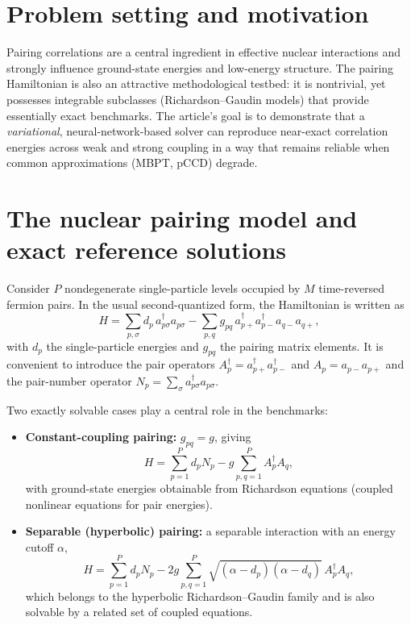 
\section{Problem setting and motivation}

Pairing correlations are a central ingredient in effective nuclear
interactions and strongly influence ground-state energies and
low-energy structure. The pairing Hamiltonian is also an attractive
methodological testbed: it is nontrivial, yet possesses integrable
subclasses (Richardson--Gaudin models) that provide essentially exact
benchmarks. The article's goal is to demonstrate that a
\emph{variational}, neural-network-based solver can reproduce
near-exact correlation energies across weak and strong coupling in a
way that remains reliable when common approximations (MBPT, pCCD)
degrade.

\section{The nuclear pairing model and exact reference solutions}
Consider $P$ nondegenerate single-particle levels occupied by $M$ time-reversed fermion pairs. In the usual
second-quantized form, the Hamiltonian is written as
\begin{equation}
H=\sum_{p,\sigma} d_p\, a_{p\sigma}^\dagger a_{p\sigma}
-\sum_{p,q} g_{pq}\, a_{p+}^\dagger a_{p-}^\dagger a_{q-} a_{q+},
\label{eq:H_full}
\end{equation}
with $d_p$ the single-particle energies and $g_{pq}$ the pairing matrix elements. It is convenient to introduce the
pair operators $A_p^\dagger=a_{p+}^\dagger a_{p-}^\dagger$ and $A_p=a_{p-}a_{p+}$ and the pair-number operator
$N_p=\sum_{\sigma}a_{p\sigma}^\dagger a_{p\sigma}$.

Two exactly solvable cases play a central role in the benchmarks:
\begin{itemize}
\item \textbf{Constant-coupling pairing:} $g_{pq}=g$, giving
\begin{equation}
H=\sum_{p=1}^P d_p N_p - g\sum_{p,q=1}^P A_p^\dagger A_q,
\label{eq:H_const}
\end{equation}
with ground-state energies obtainable from Richardson equations (coupled nonlinear equations for pair energies).

\item \textbf{Separable (hyperbolic) pairing:} a separable interaction with an energy cutoff $\alpha$,
\begin{equation}
H=\sum_{p=1}^P d_p N_p -2g\sum_{p,q=1}^P \sqrt{(\alpha-d_p)(\alpha-d_q)}\,A_p^\dagger A_q,
\label{eq:H_sep}
\end{equation}
which belongs to the hyperbolic Richardson--Gaudin family and is also solvable by a related set of coupled equations. 
\end{itemize}


